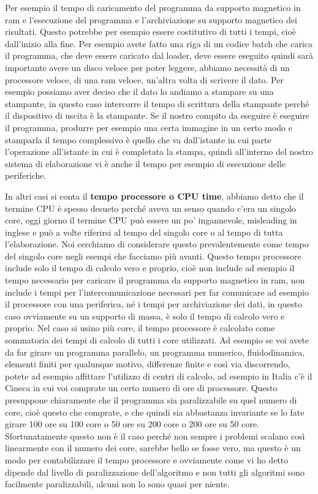 Per esempio il tempo di caricamento del programma da supporto magnetico in ram e l'esecuzione del programma e l'archiviazione su supporto magnetico dei risultati.
Questo potrebbe per esempio essere costitutivo di tutti i tempi, cioè dall'inizio alla fine.
Per esempio avete fatto una riga di un codice batch che carica il programma, che deve essere caricato dal loader, deve essere eseguito quindi sarà importante avere un disco veloce per poter leggere, abbiamo necessità di un processore veloce, di una ram veloce, un'altra volta di scrivere il dato.
Per esempio possiamo aver deciso che il dato lo andiamo a stampare su una stampante, in questo caso intercorre il tempo di scrittura della stampante perché il dispositivo di uscita è la stampante.
Se il nostro compito da eseguire è eseguire il programma, produrre per esempio una certa immagine in un certo modo e stamparla il tempo complessivo è quello che va dall'istante in cui parte l'operazione all'istante in cui è completata la stampa, quindi all'interno del nostro sistema di elaborazione vi è anche il tempo per esempio di esecuzione delle periferiche.

In altri casi si conta il \textbf{tempo processore o CPU time}, abbiamo detto che il termine CPU è spesso desueto perché aveva un senso quando c'era un singolo core, oggi giorno il termine CPU può essere un po' ingannevole, misleading in inglese e può a volte riferirsi al tempo del singolo core o al tempo di tutta l'elaborazione.
Noi cerchiamo di considerare questo prevalentemente come tempo del singolo core negli esempi che facciamo più avanti.
Questo tempo processore include solo il tempo di calcolo vero e proprio, cioè non include ad esempio il tempo necessario per caricare il programma da supporto magnetico in ram, non include i tempi per l'intercomunicazione necessari per far comunicare ad esempio il processore con una periferica, né i tempi per archiviazione dei dati, in questo caso ovviamente su un supporto di massa, è solo il tempo di calcolo vero e proprio.
Nel caso si usino più core, il tempo processore è calcolato come sommatoria dei tempi di calcolo di tutti i core utilizzati.
Ad esempio se voi avete da far girare un programma parallelo, un programma numerico, fluidodinamica, elementi finiti per qualunque motivo, differenze finite e così via discorrendo, potete ad esempio affittare l'utilizzo di centri di calcolo, ad esempio in Italia c'è il Cineca in cui voi comprate un certo numero di ore di processore.
Questo presuppone chiaramente che il programma sia paralizzabile su quel numero di core, cioè questo che comprate, e che quindi sia abbastanza invariante se lo fate girare 100 ore su 100 core o 50 ore su 200 core o 200 ore su 50 core.
Sfortunatamente questo non è il caso perché non sempre i problemi scalano così linearmente con il numero dei core, sarebbe bello se fosse vero, ma questo è un modo per contabilizzare il tempo processore e ovviamente come vi ho detto dipende dal livello di paralizzazione dell'algoritmo e non tutti gli algoritmi sono facilmente paralizzabili, alcuni non lo sono quasi per niente.

